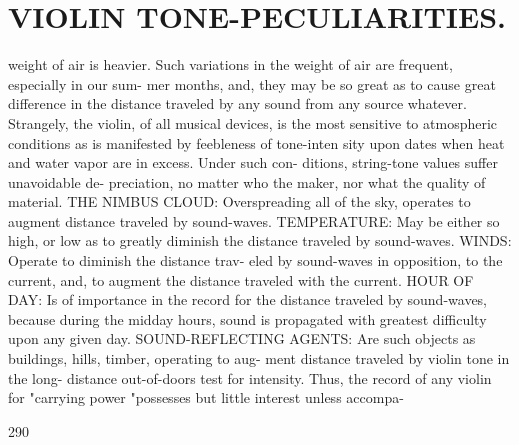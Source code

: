\documentclass{article}
\begin{document}
\section*{VIOLIN TONE-PECULIARITIES.}
weight of air is heavier. Such variations in the weight of air are frequent, especially in our sum- mer months, and, they may be so great as to cause great difference in the distance traveled by any sound from any source whatever. Strangely, the violin, of all musical devices, is the most sensitive to atmospheric conditions as is manifested by feebleness of tone-inten sity upon dates when heat and water vapor are in excess. Under such con- ditions, string-tone values suffer unavoidable de- preciation, no matter who the maker, nor what the quality of material. THE NIMBUS CLOUD: Overspreading all of the sky, operates to augment distance traveled by sound-waves. TEMPERATURE: May be either so high, or low as to greatly diminish the distance traveled by sound-waves. WINDS: Operate to diminish the distance trav- eled by sound-waves in opposition, to the current, and, to augment the distance traveled with the current. HOUR OF DAY: Is of importance in the record for the distance traveled by sound-waves, because during the midday hours, sound is propagated with greatest difficulty upon any given day. SOUND-REFLECTING AGENTS: Are such objects as buildings, hills, timber, operating to aug- ment distance traveled by violin tone in the long- distance out-of-doors test for intensity. Thus, the record of any violin for "carrying power "possesses but little interest unless accompa-

290
\end{document}
